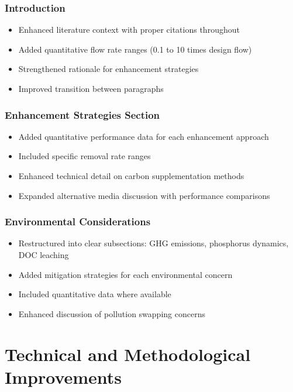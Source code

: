 \documentclass[12pt,a4paper]{article}
\begin{document}
\subsubsection{Introduction}
\begin{itemize}[leftmargin=*, itemsep=0.2em]
\item Enhanced literature context with proper citations throughout
\item Added quantitative flow rate ranges (0.1 to 10 times design flow)
\item Strengthened rationale for enhancement strategies
\item Improved transition between paragraphs
\end{itemize}

\subsubsection{Enhancement Strategies Section}
\begin{itemize}[leftmargin=*, itemsep=0.2em]
\item Added quantitative performance data for each enhancement approach
\item Included specific removal rate ranges
\item Enhanced technical detail on carbon supplementation methods
\item Expanded alternative media discussion with performance comparisons
\end{itemize}

\subsubsection{Environmental Considerations}
\begin{itemize}[leftmargin=*, itemsep=0.2em]
\item Restructured into clear subsections: GHG emissions, phosphorus dynamics, DOC leaching
\item Added mitigation strategies for each environmental concern
\item Included quantitative data where available
\item Enhanced discussion of pollution swapping concerns
\end{itemize}

\section{Technical and Methodological Improvements}
\end{document}

